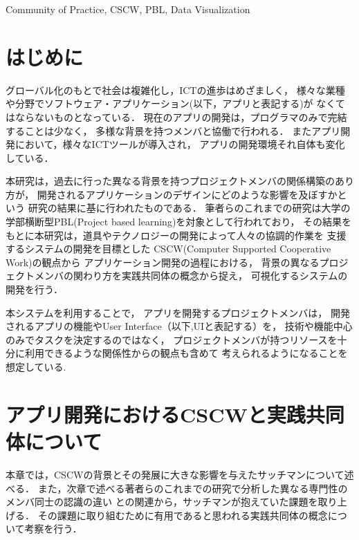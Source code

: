 \documentclass[submit,techrep]{ipsj}
\begin{document}
\begin{ekeyword}
Community of Practice, CSCW, PBL, Data Visualization
\end{ekeyword}

\maketitle

\section{はじめに}

グローバル化のもとで社会は複雑化し，ICTの進歩はめざましく，
様々な業種や分野でソフトウェア・アプリケーション(以下，アプリと表記する)が
なくてはならないものとなっている．
現在のアプリの開発は，プログラマのみで完結することは少なく，
多様な背景を持つメンバと協働で行われる．
またアプリ開発において，様々なICTツールが導入され，
アプリの開発環境それ自体も変化している．


本研究は，過去に行った異なる背景を持つプロジェクトメンバの関係構築のあり方が，
開発されるアプリケーションのデザインにどのような影響を及ぼすかという
研究\cite{preStudy}の結果に基に行われたものである．
筆者らのこれまでの研究は大学の学部横断型PBL(Project based learning)を対象として行われており，
その結果をもとに本研究は，道具やテクノロジーの開発によって人々の協調的作業を
支援するシステムの開発を目標とした
CSCW(Computer Supported Cooperative Work)\cite{cscwDefin}の観点から
アプリケーション開発の過程における，
背景の異なるプロジェクトメンバの関わり方を実践共同体の概念から捉え，
可視化するシステムの開発を行う．


本システムを利用することで，
アプリを開発するプロジェクトメンバは，
開発されるアプリの機能やUser Interface（以下,UIと表記する）を，
技術や機能中心のみでタスクを決定するのではなく，
プロジェクトメンバが持つリソースを十分に利用できるような関係性からの観点も含めて
考えられるようになることを想定している.


\section{アプリ開発におけるCSCWと実践共同体について}
\label{previous-research-cscw}

本章では，CSCWの背景とその発展に大きな影響を与えたサッチマンについて述べる．
また，次章で述べる著者らのこれまでの研究で分析した異なる専門性のメンバ同士の認識の違い
との関連から，サッチマンが抱えていた課題を取り上げる．
その課題に取り組むために有用であると思われる実践共同体の概念について考察を行う．
\end{document}
